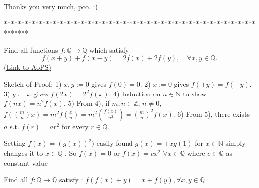 \begin{solution}
	Thanks you very much, pco. :)
\end{solution}
*******************************************************************************
-------------------------------------------------------------------------------

\begin{problem}
	Find all functions $f:\mathbb{Q}\to\mathbb{Q}$ which satisfy
\[f(x+y)+f(x-y)=2f(x)+2f(y),\quad \forall x, y\in \mathbb{Q}.\]
	\flushright \href{https://artofproblemsolving.com/community/c6h400122}{(Link to AoPS)}
\end{problem}



\begin{solution}
	Sketch of Proof:
1) $x,y:=0$ gives $f(0)=0$.
2) $x:=0$ gives $f(+y)=f(-y)$.
3) $y:=x$ gives $f(2x)=2^2f(x)$.
4) Induction on $n \in \mathbb{N}$ to show $f(nx)=n^2f(x)$.
5) From 4), if $m,n \in \mathbb{Z}$, $n \neq 0$, $f\left(\left(\frac{m}{n}\right)x\right) = m^2f\left(\frac{x}{n}\right) = m^2\left(\frac{f(x)}{n^2}\right) = \left(\frac{m}{n}\right)^2f(x)$.
6) From 5), there exists $a$ s.t. $f(r)=ar^2$ for every $r \in \mathbb{Q}$.
\end{solution}



\begin{solution}
	Setting  $f(x)=(g(x))^2)$ easily found $g(x)=\pm xg(1)$ for $x\in\mathbb{N}$ simply changes it to $x\in\mathbb{Q}$ , So $f(x)=0$ or $f(x)=cx^2$ $\forall x\in\mathbb{Q}$ where $c\in\mathbb{Q}$ as constant value
\end{solution}



\begin{solution}
	Find all $f:\mathbb{Q}\rightarrow \mathbb{Q}$ satisfy :
$f(f(x)+y)=x+f(y), \forall x, y\in \mathbb{Q}$
\end{solution}



